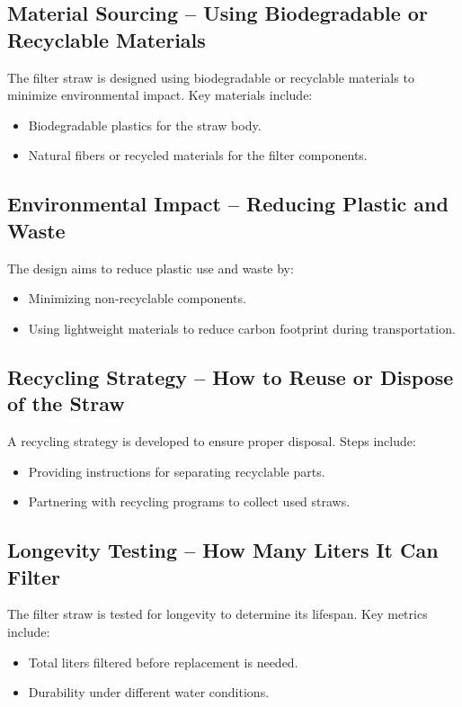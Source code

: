 \documentclass{article}
\begin{document}
\vspace{0.5cm}

\subsection{Material Sourcing – Using Biodegradable or Recyclable Materials}
The filter straw is designed using biodegradable or recyclable materials to minimize environmental impact. Key materials include:
\begin{itemize}
    \item Biodegradable plastics for the straw body.
    \item Natural fibers or recycled materials for the filter components.
\end{itemize}

\vspace{0.5cm}

\subsection{Environmental Impact – Reducing Plastic and Waste}
The design aims to reduce plastic use and waste by:
\begin{itemize}
    \item Minimizing non-recyclable components.
    \item Using lightweight materials to reduce carbon footprint during transportation.
\end{itemize}

\vspace{0.5cm}

\subsection{Recycling Strategy – How to Reuse or Dispose of the Straw}
A recycling strategy is developed to ensure proper disposal. Steps include:
\begin{itemize}
    \item Providing instructions for separating recyclable parts.
    \item Partnering with recycling programs to collect used straws.
\end{itemize}

\vspace{0.5cm}

\subsection{Longevity Testing – How Many Liters It Can Filter}
The filter straw is tested for longevity to determine its lifespan. Key metrics include:
\begin{itemize}
    \item Total liters filtered before replacement is needed.
    \item Durability under different water conditions.
\end{itemize}
\end{document}
